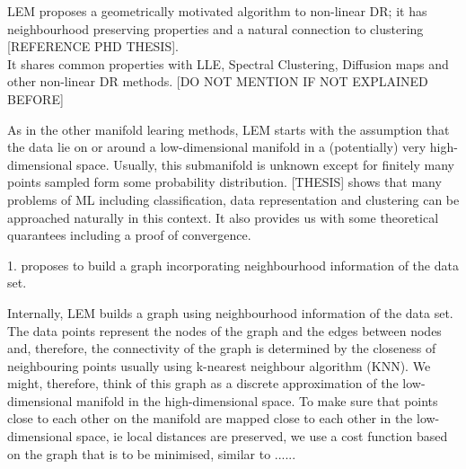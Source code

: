 \documentclass[journal, a4paper]{IEEEtran}
\begin{document}







LEM proposes a geometrically motivated algorithm to non-linear DR; it has neighbourhood preserving properties and a natural connection to clustering [REFERENCE PHD THESIS]. \\

It shares common properties with LLE, Spectral Clustering, Diffusion maps and other non-linear DR methods.
[DO NOT MENTION IF NOT EXPLAINED BEFORE]

As in the other manifold learing methods, LEM starts with the assumption that the data lie on or around a low-dimensional manifold in a (potentially) very high-dimensional space. 
Usually, this submanifold is unknown except for finitely many points sampled form some probability distribution. [THESIS] shows that many problems of ML including classification, data representation and clustering can be approached naturally in this context. It also provides us with some theoretical quarantees including a proof of convergence. 




1. proposes to build a graph incorporating neighbourhood information of the data set.


Internally, LEM builds a graph using neighbourhood information of the data set. The data points represent the nodes of the graph and the edges between nodes and, therefore, the connectivity of the graph is determined by the closeness of neighbouring points usually using k-nearest neighbour algorithm (KNN). We might, therefore, think of this graph as a discrete approximation of the low-dimensional manifold in the high-dimensional space. 
To make sure that points close to each other on the manifold are mapped close to each other in the low-dimensional space, ie local distances are preserved, we use a cost function based on the graph that is to be minimised, similar to ......
\end{document}
